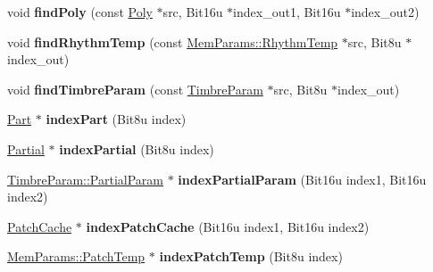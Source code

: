 \begin{DoxyCompactItemize}
\item 
\hypertarget{classMT32Emu_1_1Synth_ad5457420ef9b86360b7d9fbc46620e55}{void {\bfseries find\-Poly} (const \hyperlink{classMT32Emu_1_1Poly}{Poly} $\ast$src, Bit16u $\ast$index\-\_\-out1, Bit16u $\ast$index\-\_\-out2)}\label{classMT32Emu_1_1Synth_ad5457420ef9b86360b7d9fbc46620e55}

\item 
\hypertarget{classMT32Emu_1_1Synth_a7012a428675883dd76761fa6411ee171}{void {\bfseries find\-Rhythm\-Temp} (const \hyperlink{structMT32Emu_1_1MemParams_1_1RhythmTemp}{Mem\-Params\-::\-Rhythm\-Temp} $\ast$src, Bit8u $\ast$index\-\_\-out)}\label{classMT32Emu_1_1Synth_a7012a428675883dd76761fa6411ee171}

\item 
\hypertarget{classMT32Emu_1_1Synth_adc35df44bff7a892e28892ede3272568}{void {\bfseries find\-Timbre\-Param} (const \hyperlink{structMT32Emu_1_1TimbreParam}{Timbre\-Param} $\ast$src, Bit8u $\ast$index\-\_\-out)}\label{classMT32Emu_1_1Synth_adc35df44bff7a892e28892ede3272568}

\item 
\hypertarget{classMT32Emu_1_1Synth_adc6f45157624a0102aaa84b7d6be2d25}{\hyperlink{classMT32Emu_1_1Part}{Part} $\ast$ {\bfseries index\-Part} (Bit8u index)}\label{classMT32Emu_1_1Synth_adc6f45157624a0102aaa84b7d6be2d25}

\item 
\hypertarget{classMT32Emu_1_1Synth_a2b752a13956443972e4fb6c5df840523}{\hyperlink{classMT32Emu_1_1Partial}{Partial} $\ast$ {\bfseries index\-Partial} (Bit8u index)}\label{classMT32Emu_1_1Synth_a2b752a13956443972e4fb6c5df840523}

\item 
\hypertarget{classMT32Emu_1_1Synth_a48a40f20a3a62fed3822231d3e3b6368}{\hyperlink{structMT32Emu_1_1TimbreParam_1_1PartialParam}{Timbre\-Param\-::\-Partial\-Param} $\ast$ {\bfseries index\-Partial\-Param} (Bit16u index1, Bit16u index2)}\label{classMT32Emu_1_1Synth_a48a40f20a3a62fed3822231d3e3b6368}

\item 
\hypertarget{classMT32Emu_1_1Synth_a00db5c06ea4ba8246563a9b669396099}{\hyperlink{structMT32Emu_1_1PatchCache}{Patch\-Cache} $\ast$ {\bfseries index\-Patch\-Cache} (Bit16u index1, Bit16u index2)}\label{classMT32Emu_1_1Synth_a00db5c06ea4ba8246563a9b669396099}

\item 
\hypertarget{classMT32Emu_1_1Synth_a417d47df248a16ed618df6c3ec259f1d}{\hyperlink{structMT32Emu_1_1MemParams_1_1PatchTemp}{Mem\-Params\-::\-Patch\-Temp} $\ast$ {\bfseries index\-Patch\-Temp} (Bit8u index)}\label{classMT32Emu_1_1Synth_a417d47df248a16ed618df6c3ec259f1d}


\end{DoxyCompactItemize}
